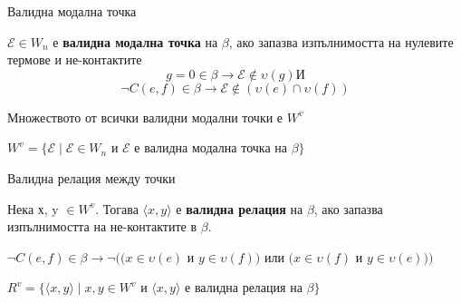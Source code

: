 \documentclass[14pt, aspectratio=169]{beamer}
\newcommand\E{\mathcal{E}}
\newcommand{\pair}[2]{ \langle #1, #2 \rangle }
\newcommand{\pairXY}{ \pair{x}{y} }
\begin{document}

\begin{frame}{Валидна модална точка}
	\begin{definition}
		$\E \in W_n$ е \textbf{валидна модална точка} на $\beta$, ако запазва изпълнимостта на нулевите термове и не-контактите
		\begin{equation*}
			g = 0 \in \beta \rightarrow \E \notin \upsilon(g) И
		\end{equation*}
		\begin{equation*}
			\neg C(e, f) \in \beta \rightarrow \E \notin (\upsilon(e) \cap \upsilon(f))
		\end{equation*}
	\end{definition}

	\begin{definition}[$W^v$]
		Множеството от всички валидни модални точки е \textbf{$W^v$}
		\begin{center}
			$W^v = \{ \E \mid \E \in W_n$ и $\E$ е валидна модална точка на $\beta \}$
		\end{center}
	\end{definition}
\end{frame}

\begin{frame}{Валидна релация между точки}
	\begin{definition}
		Нека х, y $\in W^v$. Тогава $\pairXY$ е \textbf{валидна релация} на $\beta$, ако запазва изпълнимостта на не-контактите в $\beta$.
		\begin{center}
			$\neg C(e, f) \in \beta \rightarrow \neg((x \in \upsilon(e)$ и $y \in \upsilon(f))$ или $(x \in \upsilon(f)$ и $y \in \upsilon(e)))$
		\end{center}
	\end{definition}

	\begin{definition}[$R^v$]
		\begin{center}
			$R^v = \{ \pairXY  \mid x, y \in W^v$ и $\pairXY$  е валидна релация на $\beta\}$
		\end{center}
	\end{definition}
\end{frame}
\end{document}
